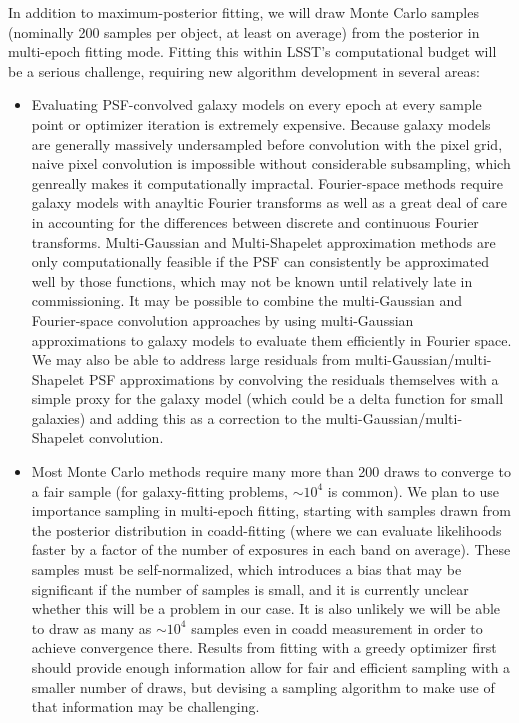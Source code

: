 In addition to maximum-posterior fitting, we will draw Monte Carlo samples (nominally 200 samples per object, at least on average) from the posterior in multi-epoch fitting mode.  Fitting this within LSST's computational budget will be a serious challenge, requiring new algorithm development in several areas:
\begin{itemize}
\item Evaluating PSF-convolved galaxy models on every epoch at every sample point or optimizer iteration is extremely expensive.  Because galaxy models are generally massively undersampled before convolution with the pixel grid, naive pixel convolution is impossible without considerable subsampling, which genreally makes it computationally impractal.  Fourier-space methods require galaxy models with anayltic Fourier transforms as well as a great deal of care in accounting for the differences between discrete and continuous Fourier transforms.  Multi-Gaussian and Multi-Shapelet approximation methods are only computationally feasible if the PSF can consistently be approximated well by those functions, which may not be known until relatively late in commissioning.  It may be possible to combine the multi-Gaussian and Fourier-space convolution approaches by using multi-Gaussian approximations to galaxy models to evaluate them efficiently in Fourier space.  We may also be able to address large residuals from multi-Gaussian/multi-Shapelet PSF approximations by convolving the residuals themselves with a simple proxy for the galaxy model (which could be a delta function for small galaxies) and adding this as a correction to the multi-Gaussian/multi-Shapelet convolution.
\item Most Monte Carlo methods require many more than 200 draws to converge to a fair sample (for galaxy-fitting problems, $\sim 10^4$ is common).  We plan to use importance sampling in multi-epoch fitting, starting with samples drawn from the posterior distribution in coadd-fitting (where we can evaluate likelihoods faster by a factor of the number of exposures in each band on average).  These samples must be self-normalized, which introduces a bias that may be significant if the number of samples is small, and it is currently unclear whether this will be a problem in our case.  It is also unlikely we will be able to draw as many as $\sim 10^4$ samples even in coadd measurement in order to achieve convergence there.  Results from fitting with a greedy optimizer first should provide enough information allow for fair and efficient sampling with a smaller number of draws, but devising a sampling algorithm to make use of that information may be challenging.
\end{itemize}

